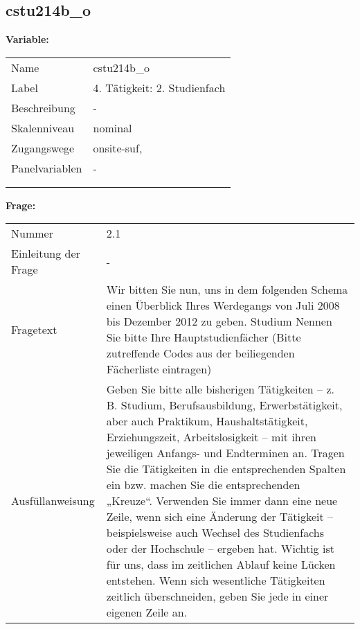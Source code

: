 	
	
	\subsection{cstu214b\_o}
	\label{subSection:cstu214b_o}

	\noindent\textbf{Variable:}\\
		\begin{tabular}{lL{11.3cm}}
			\label{tableVariable:cstu214b_o}
			Name & cstu214b\_o \\
			Label & 4. Tätigkeit: 2. Studienfach \\
			Beschreibung & - \\
			Skalenniveau & nominal \\
			Zugangswege &
				onsite-suf,
 \\
			Panelvariablen & -
			 \\
			 \\
 \\
		\end{tabular}

		\vspace*{1 cm}
		\noindent\textbf{Frage:}\\
		\begin{tabular}{lL{11.3cm}}
			\label{tableQuestion:cstu214b_o}
			Nummer & 2.1 \\
			Einleitung der Frage & - \\
			Fragetext & Wir bitten Sie nun, uns in dem folgenden Schema einen Überblick Ihres Werdegangs von Juli 2008 bis Dezember 2012 zu geben.
Studium
Nennen Sie bitte Ihre Hauptstudienfächer
(Bitte zutreffende Codes aus der beiliegenden Fächerliste eintragen) \\
			Ausfüllanweisung & Geben Sie bitte alle bisherigen Tätigkeiten – z. B. Studium, Berufsausbildung, Erwerbstätigkeit, aber auch Praktikum, Haushaltstätigkeit,
Erziehungszeit, Arbeitslosigkeit – mit ihren jeweiligen Anfangs- und Endterminen an. Tragen Sie die Tätigkeiten in die entsprechenden Spalten ein bzw. machen Sie die entsprechenden „Kreuze“. Verwenden Sie immer dann eine neue Zeile, wenn sich eine Änderung der Tätigkeit – beispielsweise auch Wechsel des Studienfachs oder der Hochschule – ergeben hat. Wichtig ist für uns, dass im zeitlichen Ablauf keine Lücken entstehen. Wenn sich wesentliche Tätigkeiten zeitlich überschneiden, geben Sie jede in einer eigenen Zeile an. \\
		\end{tabular}





